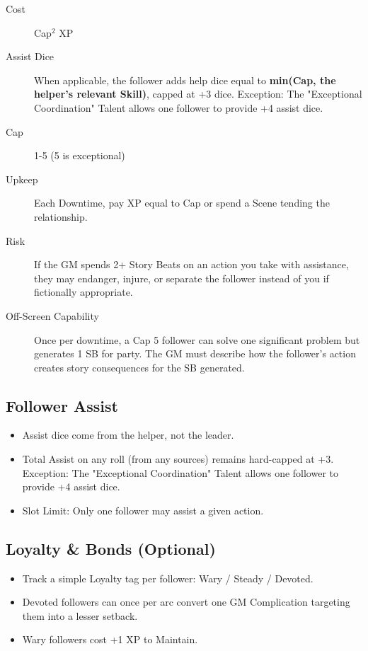 \begin{description}
\item[Cost] Cap$^2$ XP
\item[Assist Dice] When applicable, the follower adds help dice equal to \textbf{min(Cap, the helper's relevant Skill)}, capped at +3 dice. Exception: The "Exceptional Coordination" Talent allows one follower to provide +4 assist dice.
\item[Cap] 1-5 (5 is exceptional)
\item[Upkeep] Each Downtime, pay XP equal to Cap or spend a Scene tending the relationship.
\item[Risk] If the GM spends 2+ Story Beats on an action you take with assistance, they may endanger, injure, or separate the follower instead of you if fictionally appropriate.
\item[Off-Screen Capability] Once per downtime, a Cap 5 follower can solve one significant problem but generates 1 SB for party. The GM must describe how the follower's action creates story consequences for the SB generated.
\end{description}

\subsection{Follower Assist}
\begin{itemize}
    \item Assist dice come from the helper, not the leader.
    \item Total Assist on any roll (from any sources) remains hard-capped at +3. Exception: The "Exceptional Coordination" Talent allows one follower to provide +4 assist dice.
    \item Slot Limit: Only one follower may assist a given action.
\end{itemize}

\subsection{Loyalty \& Bonds (Optional)}
\begin{itemize}
    \item Track a simple Loyalty tag per follower: Wary / Steady / Devoted.
    \item Devoted followers can once per arc convert one GM Complication targeting them into a lesser setback.
    \item Wary followers cost +1 XP to Maintain.
\end{itemize}

